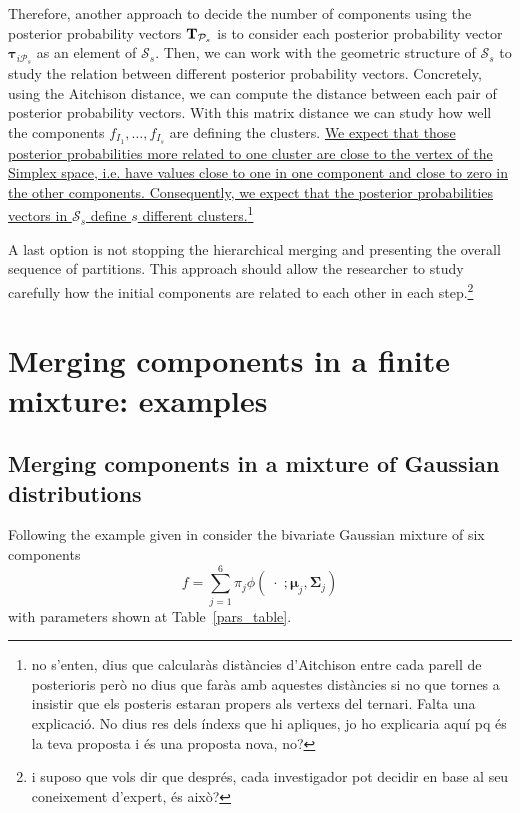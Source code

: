 \documentclass[submit]{smj}
\theoremstyle{definition}
\newcommand{\m}[1]{\boldsymbol{#1}}
\begin{document}
Therefore, another approach to decide the number of components using the posterior probability vectors $\text{\textbf{T}}_{\mathcal{P}_s}$ is to consider each posterior probability vector $\m\tau_{i\mathcal{P}_s}$ as an element of $\mathcal{S}_s$. Then, we can work with the geometric structure of $\mathcal{S}_s$ to study the relation between different posterior probability vectors. Concretely, using the Aitchison distance, we can compute the distance between each pair of posterior probability vectors. With this matrix distance we can study how well the components $f_{I_1}, \dots, f_{I_s}$ are defining the clusters. \ul{ We expect that those posterior probabilities more related to one cluster are close to the vertex of the Simplex space, i.e. have values close to one in one component and close to zero in the other components. Consequently, we expect that the posterior probabilities vectors in $\mathcal{S}_s$ define $s$ different clusters.}\footnote{no s'enten, dius que calcularàs distàncies d'Aitchison entre cada parell de posterioris però no dius que faràs amb aquestes distàncies si no que tornes a insistir que els posteris estaran propers als vertexs del ternari. Falta una explicació. No dius res dels índexs que hi apliques, jo ho explicaria aquí pq és la teva proposta i és una proposta nova, no?}

A last option is not stopping the hierarchical merging and presenting the overall sequence of partitions. This approach should allow the researcher to study carefully how the initial components are related to each other in each step.\footnote{i suposo que vols dir que després, cada investigador pot decidir en base al seu coneixement d'expert, és això?}


\section{Merging components in a finite mixture: examples}\label{merging_examples_dist}

\subsection{Merging components in a mixture of Gaussian distributions}

Following the example given in \cite{baudry2010combining} consider the bivariate Gaussian mixture of six components
\[
f= \sum_{j=1}^6 \pi_j \phi(\;\cdot\; ;  \m\mu_j, \m\Sigma_j)
\]
with parameters shown at Table~\ref{pars_table}. 
\end{document}
